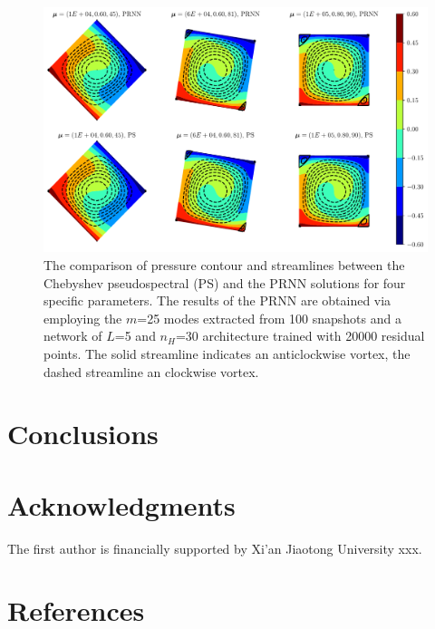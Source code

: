 \documentclass[preprint, 10pt]{elsarticle}
\begin{document}
\begin{figure}[!ht]
  \centering
  \includegraphics[width=16cm]{../../pythonNN/2DNaturalConvection/fig/ResultComparsion.pdf}
\caption{The comparison of pressure contour and streamlines between the Chebyshev pseudospectral (PS) and the PRNN solutions for four specific parameters. The results of the PRNN are obtained via employing the $m$=25 modes extracted from 100 snapshots and a network of $L$=5 and $n_H$=30 architecture trained with 20000 residual points. The solid streamline indicates an anticlockwise vortex, the dashed streamline an clockwise vortex.}
\label{fig_2DNaturalConvectionResultComparsion}
\end{figure}



\section{Conclusions}





\section*{Acknowledgments}
The first author is financially supported by Xi'an Jiaotong University xxx.

\section*{References}


\end{document}
